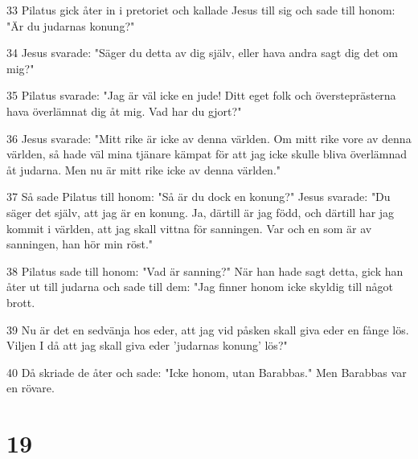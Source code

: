 \par 33 Pilatus gick åter in i pretoriet och kallade Jesus till sig och sade till honom: "Är du judarnas konung?"
\par 34 Jesus svarade: "Säger du detta av dig själv, eller hava andra sagt dig det om mig?"
\par 35 Pilatus svarade: "Jag är väl icke en jude! Ditt eget folk och översteprästerna hava överlämnat dig åt mig. Vad har du gjort?"
\par 36 Jesus svarade: "Mitt rike är icke av denna världen. Om mitt rike vore av denna världen, så hade väl mina tjänare kämpat för att jag icke skulle bliva överlämnad åt judarna. Men nu är mitt rike icke av denna världen."
\par 37 Så sade Pilatus till honom: "Så är du dock en konung?" Jesus svarade: "Du säger det själv, att jag är en konung. Ja, därtill är jag född, och därtill har jag kommit i världen, att jag skall vittna för sanningen. Var och en som är av sanningen, han hör min röst."
\par 38 Pilatus sade till honom: "Vad är sanning?" När han hade sagt detta, gick han åter ut till judarna och sade till dem: "Jag finner honom icke skyldig till något brott.
\par 39 Nu är det en sedvänja hos eder, att jag vid påsken skall giva eder en fånge lös. Viljen I då att jag skall giva eder 'judarnas konung' lös?"
\par 40 Då skriade de åter och sade: "Icke honom, utan Barabbas." Men Barabbas var en rövare.

\chapter{19}

